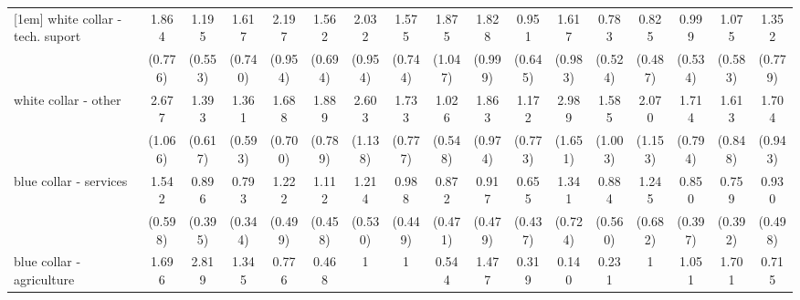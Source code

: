 {\begin{tabular}{l*{16}{c}}
[1em]
white collar - tech. suport&       1.864         &       1.195         &       1.617         &       2.197         &       1.562         &       2.032         &       1.575         &       1.875         &       1.828         &       0.951         &       1.617         &       0.783         &       0.825         &       0.999         &       1.075         &       1.352         \\
                    &     (0.776)         &     (0.553)         &     (0.740)         &     (0.954)         &     (0.694)         &     (0.954)         &     (0.744)         &     (1.047)         &     (0.999)         &     (0.645)         &     (0.983)         &     (0.524)         &     (0.487)         &     (0.534)         &     (0.583)         &     (0.779)         \\
[1em]
white collar - other&       2.677\sym{*}  &       1.393         &       1.361         &       1.688         &       1.889         &       2.603\sym{*}  &       1.733         &       1.026         &       1.863         &       1.172         &       2.989\sym{*}  &       1.585         &       2.070         &       1.714         &       1.613         &       1.704         \\
                    &     (1.066)         &     (0.617)         &     (0.593)         &     (0.700)         &     (0.789)         &     (1.138)         &     (0.777)         &     (0.548)         &     (0.974)         &     (0.773)         &     (1.651)         &     (1.003)         &     (1.153)         &     (0.794)         &     (0.848)         &     (0.943)         \\
[1em]
blue collar - services&       1.542         &       0.896         &       0.793         &       1.222         &       1.112         &       1.214         &       0.988         &       0.872         &       0.917         &       0.655         &       1.341         &       0.884         &       1.245         &       0.850         &       0.759         &       0.930         \\
                    &     (0.598)         &     (0.395)         &     (0.344)         &     (0.499)         &     (0.458)         &     (0.530)         &     (0.449)         &     (0.471)         &     (0.479)         &     (0.437)         &     (0.724)         &     (0.560)         &     (0.682)         &     (0.397)         &     (0.392)         &     (0.498)         \\
[1em]
blue collar - agriculture&       1.696         &       2.819         &       1.345         &       0.776         &       0.468         &           1         &           1         &       0.544         &       1.477         &       0.319         &       0.140         &       0.231         &           1         &       1.051         &       1.701         &       0.715         \\

\end{tabular}}
